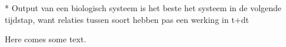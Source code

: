 \documentclass[../main.tex]{subfiles}
\begin{document}
* Output van een biologisch systeem is het beste het systeem in de volgende tijdstap, want relaties tussen soort hebben pas een werking in t+dt

Here comes some text.


\biblio
\end{document}
